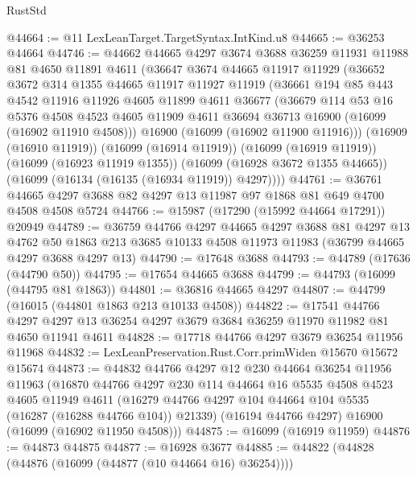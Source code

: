 \begin{lexlean}{RustStd}
\begin{coremodule}
@44664 := @11 LexLeanTarget.TargetSyntax.IntKind.u8
@44665 := @36253 @44664
@44746 := @44662
    @44665
    @4297
    @3674
    @3688
    @36259
    @11931
    @11988
    @81
    @4650
    @11891
    @4611
    (@36647
      @3674
      @44665
      @11917
      @11929
      (@36652
        @3672
        @314
        @1355
        @44665
        @11917
        @11927
        @11919
        (@36661
          @194
          @85
          @443
          @4542
          @11916
          @11926
          @4605
          @11899
          @4611
          @36677
          (@36679
            @114
            @53
            @16
            @5376
            @4508
            @4523
            @4605
            @11909
            @4611
            @36694
            @36713
            @16900
            (@16099 (@16902 @11910 @4508)))
          @16900
          (@16099 (@16902 @11900 @11916)))
        (@16909 (@16910 @11919))
        (@16099 (@16914 @11919))
        (@16099 (@16919 @11919))
        (@16099 (@16923 @11919 @1355))
        (@16099 (@16928 @3672 @1355 @44665))
        (@16099 (@16134 (@16135 (@16934 @11919)) @4297))))
@44761 := @36761 @44665 @4297 @3688 @82 @4297 @13 @11987 @97 @1868 @81 @649 @4700 @4508 @4508 @5724
@44766 := @15987 (@17290 (@15992 @44664 @17291)) @20949
@44789 := @36759
    @44766
    @4297
    @44665
    @4297
    @3688
    @81
    @4297
    @13
    @4762
    @50
    @1863
    @213
    @3685
    @10133
    @4508
    @11973
    @11983
    (@36799 @44665 @4297 @3688 @4297 @13)
@44790 := @17648 @3688
@44793 := @44789 (@17636 (@44790 @50))
@44795 := @17654 @44665 @3688
@44799 := @44793 (@16099 (@44795 @81 @1863))
@44801 := @36816 @44665 @4297
@44807 := @44799 (@16015 (@44801 @1863 @213 @10133 @4508))
@44822 := @17541
    @44766
    @4297
    @4297
    @13
    @36254
    @4297
    @3679
    @3684
    @36259
    @11970
    @11982
    @81
    @4650
    @11941
    @4611
@44828 := @17718 @44766 @4297 @3679 @36254 @11956 @11968
@44832 := LexLeanPreservation.Rust.Corr.primWiden @15670 @15672 @15674
@44873 := @44832
    @44766
    @4297
    @12
    @230
    @44664
    @36254
    @11956
    @11963
    (@16870
      @44766
      @4297
      @230
      @114
      @44664
      @16
      @5535
      @4508
      @4523
      @4605
      @11949
      @4611
      (@16279 @44766 @4297 @104 @44664 @104 @5535 (@16287 (@16288 @44766 @104)) @21339)
      (@16194 @44766 @4297)
      @16900
      (@16099 (@16902 @11950 @4508)))
@44875 := @16099 (@16919 @11959)
@44876 := @44873 @44875
@44877 := @16928 @3677
@44885 := @44822 (@44828 (@44876 (@16099 (@44877 (@10 @44664 @16) @36254))))

\end{coremodule}
\end{lexlean}
